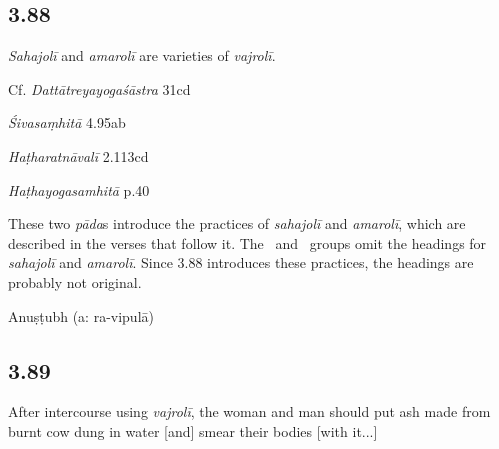 \begin{ekdosis}
\subsection*{3.88}
\begin{translation}[hp03_088]
\emph{Sahajolī} and \emph{amarolī} are varieties of \emph{vajrolī}. 
\end{translation}

\begin{sources}[hp03_088]
Cf. \emph{Dattātreyayogaśāstra} 31cd
\begin{versinnote}
\end{versinnote}

\emph{Śivasaṃhitā} 4.95ab
\begin{versinnote}
\end{versinnote}
\end{sources}

\begin{testimonia}[hp03_088]
\emph{Haṭharatnāvalī} 2.113cd
\begin{versinnote}
\end{versinnote}

\emph{Haṭhayogasamhitā} p.40
\begin{versinnote}
\end{versinnote}
\end{testimonia}

\begin{philcomm}[hp03_088]
These two \emph{pāda}s introduce the practices of \emph{sahajolī} and \emph{amarolī}, which are described in the verses that follow it. The \textalpha\ and \textbeta\ groups omit the headings for \emph{sahajolī} and \emph{amarolī}. Since 3.88 introduces these practices, the headings are probably not original.

\end{philcomm}

\begin{metre}[hp03_088]
Anuṣṭubh (a: ra-vipulā)
\end{metre}

\subsection*{3.89}
\begin{translation}[hp03_089]
After intercourse using \emph{vajrolī}, the woman and man should put ash made from burnt cow dung in water [and] smear their bodies [with it...]
\end{translation}


\end{ekdosis}
